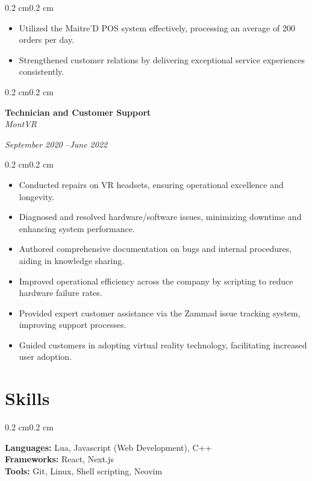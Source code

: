 \documentclass[10pt, letterpaper]{article}
\newenvironment{highlights}{%
    \begin{itemize}[
        topsep=0.10 cm,%
        parsep=0.10 cm,%
        partopsep=0pt,%
        itemsep=0pt,%
        leftmargin=0.4 cm + 10pt%
    ]
}{%
    \end{itemize}%
}
\newenvironment{onecolentry}{%
    \begin{adjustwidth}{0.2 cm}{0.2 cm}%
}{%
    \end{adjustwidth}%
}
\newenvironment{twocolentry}[1]{%
    \begin{onecolentry}%
    \def\twocolentryarg{#1}%
    \noindent
    \begin{minipage}[t]{0.68\textwidth} %
}{%
    \end{minipage}\hfill%
    \begin{minipage}[t]{0.30\textwidth} %
      \raggedleft\twocolentryarg
    \end{minipage}%
    \vspace{0.2cm}%
    \end{onecolentry}%
}
\begin{document}
\vspace{0.10 cm}
\begin{onecolentry}
    \begin{highlights}
        \item Utilized the Maitre'D POS system effectively, processing an average of 200 orders per day.
        \item Strengthened customer relations by delivering exceptional service experiences consistently.
    \end{highlights}
\end{onecolentry}
\vspace{0.2 cm}
\begin{twocolentry}{%
\textit{September 2020 }--\textit{June 2022} \\[0.1cm]
\textit{}%
}
    \textbf{Technician and Customer Support }\\
    \textit{MontVR }
\end{twocolentry}
\vspace{0.10 cm}
\begin{onecolentry}
    \begin{highlights}
        \item Conducted repairs on VR headsets, ensuring operational excellence and longevity.
        \item Diagnosed and resolved hardware/software issues, minimizing downtime and enhancing system performance.
        \item Authored comprehensive documentation on bugs and internal procedures, aiding in knowledge sharing.
        \item Improved operational efficiency across the company by scripting to reduce hardware failure rates.
        \item Provided expert customer assistance via the Zammad issue tracking system, improving support processes.
        \item Guided customers in adopting virtual reality technology, facilitating increased user adoption.
    \end{highlights}
\end{onecolentry}
\vspace{0.2 cm}


\section{Skills}
\begin{onecolentry}
    \textbf{Languages:} Lua, Javascript (Web Development), C++\\
    \textbf{Frameworks:} React, Next.js\\
    \textbf{Tools:} Git, Linux, Shell scripting, Neovim\\
\end{onecolentry}
\end{document}
